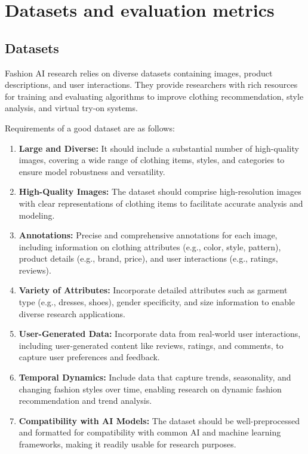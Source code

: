 \section{\textbf{Datasets and evaluation metrics}} \label{section:datasets}
	\subsection{\textbf{Datasets}}
		Fashion AI research relies on diverse datasets containing images, product descriptions, and user interactions. They provide researchers with rich resources for training and evaluating algorithms to improve clothing recommendation, style analysis, and virtual try-on systems.

		Requirements of a good dataset are as follows:

		\begin{enumerate}
			\item \textbf{Large and Diverse:} It should include a substantial number of high-quality images, covering a wide range of clothing items, styles, and categories to ensure model robustness and versatility.
			\item \textbf{High-Quality Images:} The dataset should comprise high-resolution images with clear representations of clothing items to facilitate accurate analysis and modeling.
			\item \textbf{Annotations:} Precise and comprehensive annotations for each image, including information on clothing attributes (e.g., color, style, pattern), product details (e.g., brand, price), and user interactions (e.g., ratings, reviews).
			\item \textbf{Variety of Attributes:} Incorporate detailed attributes such as garment type (e.g., dresses, shoes), gender specificity, and size information to enable diverse research applications.
			\item \textbf{User-Generated Data:} Incorporate data from real-world user interactions, including user-generated content like reviews, ratings, and comments, to capture user preferences and feedback.
			\item \textbf{Temporal Dynamics:} Include data that capture trends, seasonality, and changing fashion styles over time, enabling research on dynamic fashion recommendation and trend analysis.
			\item \textbf{Compatibility with AI Models:} The dataset should be well-preprocessed and formatted for compatibility with common AI and machine learning frameworks, making it readily usable for research purposes.

\end{enumerate}
